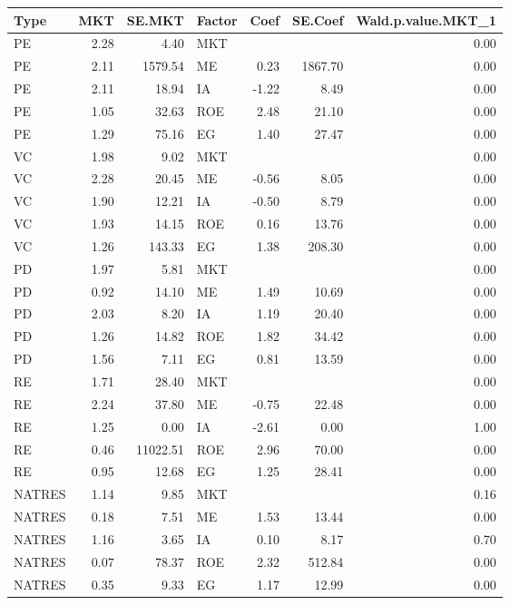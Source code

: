 \documentclass[12pt]{article}
\begin{document}
\begin{table}[ht]
	\centering
	\begin{tabular}{lrrlrrr}
		Type & MKT & SE.MKT & Factor & Coef & SE.Coef & Wald.p.value.MKT\_1 \\ 
		\hline
		\hline
		PE & 2.28 & 4.40 & MKT &  &  & 0.00 \\ 
		PE & 2.11 & 1579.54 & ME & 0.23 & 1867.70 & 0.00 \\ 
		PE & 2.11 & 18.94 & IA & -1.22 & 8.49 & 0.00 \\ 
		PE & 1.05 & 32.63 & ROE & 2.48 & 21.10 & 0.00 \\ 
		PE & 1.29 & 75.16 & EG & 1.40 & 27.47 & 0.00 \\ 
		\hline
		VC & 1.98 & 9.02 & MKT &  &  & 0.00 \\ 
		VC & 2.28 & 20.45 & ME & -0.56 & 8.05 & 0.00 \\ 
		VC & 1.90 & 12.21 & IA & -0.50 & 8.79 & 0.00 \\ 
		VC & 1.93 & 14.15 & ROE & 0.16 & 13.76 & 0.00 \\ 
		VC & 1.26 & 143.33 & EG & 1.38 & 208.30 & 0.00 \\ 
		\hline
		PD & 1.97 & 5.81 & MKT &  &  & 0.00 \\ 
		PD & 0.92 & 14.10 & ME & 1.49 & 10.69 & 0.00 \\ 
		PD & 2.03 & 8.20 & IA & 1.19 & 20.40 & 0.00 \\ 
		PD & 1.26 & 14.82 & ROE & 1.82 & 34.42 & 0.00 \\ 
		PD & 1.56 & 7.11 & EG & 0.81 & 13.59 & 0.00 \\ 
		\hline
		RE & 1.71 & 28.40 & MKT &  &  & 0.00 \\ 
		RE & 2.24 & 37.80 & ME & -0.75 & 22.48 & 0.00 \\ 
		RE & 1.25 & 0.00 & IA & -2.61 & 0.00 & 1.00 \\ 
		RE & 0.46 & 11022.51 & ROE & 2.96 & 70.00 & 0.00 \\ 
		RE & 0.95 & 12.68 & EG & 1.25 & 28.41 & 0.00 \\ 
		\hline
		NATRES & 1.14 & 9.85 & MKT &  &  & 0.16 \\ 
		NATRES & 0.18 & 7.51 & ME & 1.53 & 13.44 & 0.00 \\ 
		NATRES & 1.16 & 3.65 & IA & 0.10 & 8.17 & 0.70 \\ 
		NATRES & 0.07 & 78.37 & ROE & 2.32 & 512.84 & 0.00 \\ 
		NATRES & 0.35 & 9.33 & EG & 1.17 & 12.99 & 0.00 \\ 

\end{tabular}
\end{table}
\end{document}
